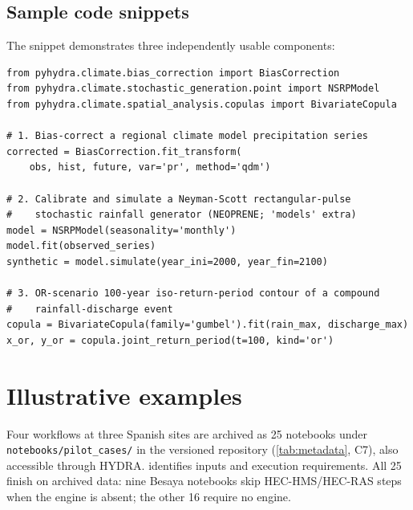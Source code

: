 \documentclass[preprint,12pt,a4paper]{elsarticle}
\begin{document}
\clearpage
\begin{minipage}{\linewidth}
\subsection{Sample code snippets}
\label{sec:snippets}

The snippet demonstrates three independently usable components:

\begin{lstlisting}
from pyhydra.climate.bias_correction import BiasCorrection
from pyhydra.climate.stochastic_generation.point import NSRPModel
from pyhydra.climate.spatial_analysis.copulas import BivariateCopula

# 1. Bias-correct a regional climate model precipitation series
corrected = BiasCorrection.fit_transform(
    obs, hist, future, var='pr', method='qdm')

# 2. Calibrate and simulate a Neyman-Scott rectangular-pulse
#    stochastic rainfall generator (NEOPRENE; 'models' extra)
model = NSRPModel(seasonality='monthly')
model.fit(observed_series)
synthetic = model.simulate(year_ini=2000, year_fin=2100)

# 3. OR-scenario 100-year iso-return-period contour of a compound
#    rainfall-discharge event
copula = BivariateCopula(family='gumbel').fit(rain_max, discharge_max)
x_or, y_or = copula.joint_return_period(t=100, kind='or')
\end{lstlisting}
\end{minipage}

\section{Illustrative examples}
\label{sec:examples}

Four workflows at three Spanish sites are archived as 25 notebooks under
\texttt{notebooks/pilot\_cases/} in the versioned repository
(\cref{tab:metadata}, C7), also accessible through HYDRA.
 identifies inputs and execution requirements.
All 25 finish on archived data: nine Besaya notebooks skip HEC-HMS/HEC-RAS
steps when the engine is absent; the other 16 require no engine.
\end{document}
